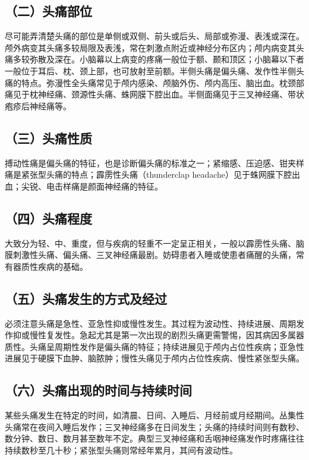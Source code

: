 \subsection{（二）头痛部位}

尽可能弄清楚头痛的部位是单侧或双侧、前头或后头、局部或弥漫、表浅或深在。颅外病变其头痛多较局限及表浅，常在刺激点附近或神经分布区内；颅内病变其头痛多较弥散及深在。小脑幕以上病变的疼痛一般位于额、颞和顶区；小脑幕以下者一般位于耳后、枕、颈上部，也可放射至前额。半侧头痛是偏头痛、发作性半侧头痛的特点。弥漫性全头痛常见于颅内感染、颅脑外伤、颅内高压、脑出血。枕颈部痛见于枕神经痛、颈源性头痛、蛛网膜下腔出血。半侧面痛见于三叉神经痛、带状疱疹后神经痛等。

\subsection{（三）头痛性质}

搏动性痛是偏头痛的特征，也是诊断偏头痛的标准之一；紧缩感、压迫感、钳夹样痛是紧张型头痛的特点；霹雳性头痛（thunderclap
headache）见于蛛网膜下腔出血；尖锐、电击样痛是颜面神经痛的特征。

\subsection{（四）头痛程度}

大致分为轻、中、重度，但与疾病的轻重不一定呈正相关，一般以霹雳性头痛、脑膜刺激性头痛、偏头痛、三叉神经痛最剧。妨碍患者入睡或使患者痛醒的头痛，常有器质性疾病的基础。

\subsection{（五）头痛发生的方式及经过}

必须注意头痛是急性、亚急性抑或慢性发生。其过程为波动性、持续进展、周期发作抑或慢性复发性。急起尤其是第一次出现的剧烈头痛更需警惕，因其病因多属器质性。头痛呈周期性发作是偏头痛的特征；持续进展见于颅内占位性疾病；亚急性进展见于硬膜下血肿、脑脓肿；慢性头痛见于颅内占位性疾病、慢性紧张型头痛。

\subsection{（六）头痛出现的时间与持续时间}

某些头痛发生在特定的时间，如清晨、日间、入睡后、月经前或月经期间。丛集性头痛常在夜间入睡后发作；三叉神经痛多在日间发生；头痛的持续时间则有数秒、数分钟、数日、数月甚至数年不定。典型三叉神经痛和舌咽神经痛发作时疼痛往往持续数秒至几十秒；紧张型头痛则常经年累月，其间有波动性。

